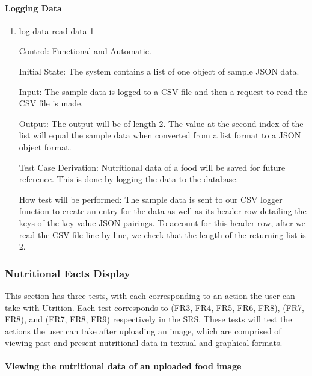 \documentclass[12pt, titlepage]{article}
\begin{document}
	\paragraph{Logging Data}
	
	\begin{enumerate}
		
		\item{log-data-read-data-1\\}
		
		Control: Functional and Automatic.
		
		Initial State: The system contains a list of one object of sample JSON data.
		
		Input: The sample data is logged to a CSV file and then a request to read the CSV file is made.
		
		Output: The output will be of length 2. The value at the second index of the list will equal the sample data when converted from a list format to a JSON object format. 
		
		Test Case Derivation: Nutritional data of a food will be saved for 
		future reference. This is done by logging the data to the database.
		
		How test will be performed: The sample data is sent to our CSV logger function to create an entry for the data as well as its header row detailing the keys of the key value JSON pairings. To account for this header row, after we read the CSV file line by line, we check that the length of the returning list is 2.
		
	\end{enumerate}
	
	\subsubsection{Nutritional Facts Display}
	This section has three tests, with each corresponding to an action the user can take with Utrition. Each test corresponds to (FR3, FR4, FR5, FR6, FR8), (FR7, FR8), and (FR7, FR8, FR9) respectively in the SRS. These tests will test the actions the user can take after uploading an image, which are comprised of viewing past and present nutritional data in textual and graphical formats.
	
	
	
	\paragraph{Viewing the nutritional data of an uploaded food image}
	
\end{document}
